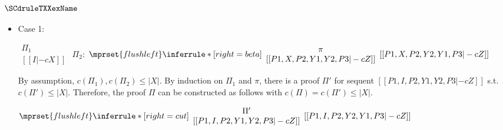 \subsubsection{$\SCdruleTXXexName$}
\begin{itemize}
\item Case 1:
      \begin{center}
        \scriptsize
        \begin{math}
          \begin{array}{c}
            \Pi_1 \\
            {[[I |-c X]]}
          \end{array}
        \end{math}
        \qquad\qquad
        $\Pi_2$:
        \begin{math}
          $$\mprset{flushleft}
          \inferrule* [right={\tiny beta}] {
            {
              \begin{array}{c}
                \pi \\
                {[[P1, X, P2, Y1, Y2, P3 |-c Z]]}
              \end{array}
            }
          }{[[P1, X, P2, Y2, Y1, P3 |-c Z]]}
        \end{math}
      \end{center}
      By assumption, $c(\Pi_1),c(\Pi_2)\leq |X|$. By induction on $\Pi_1$
      and $\pi$, there is a proof $\Pi'$ for sequent
      $[[P1, I, P2, Y1, Y2, P3 |-c Z]]$ s.t. $c(\Pi') \leq |X|$. Therefore,
      the proof $\Pi$ can be constructed as follows with
      $c(\Pi) = c(\Pi') \leq |X|$.
      \begin{center}
        \scriptsize
        \begin{math}
          $$\mprset{flushleft}
          \inferrule* [right={\tiny cut}] {
            {
              \begin{array}{cc}
                \Pi' \\
                {[[P1, I, P2, Y1, Y2, P3 |-c Z]]}
              \end{array}
            }
          }{[[P1, I, P2, Y2, Y1, P3 |-c Z]]}
        \end{math}
      \end{center}


\end{itemize}

